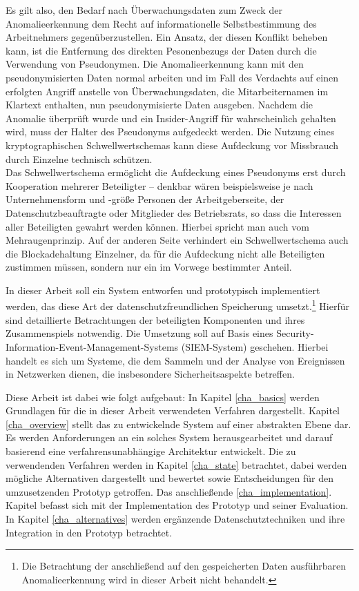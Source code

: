 Es gilt also, den Bedarf nach Überwachungsdaten zum Zweck der Anomalieerkennung dem Recht auf informationelle Selbstbestimmung des Arbeitnehmers gegenüberzustellen. 
Ein Ansatz, der diesen Konflikt beheben kann, ist die Entfernung des direkten Pesonenbezugs der Daten durch die Verwendung von Pseudonymen. Die Anomalieerkennung kann mit den pseudonymisierten Daten normal arbeiten und im Fall des Verdachts auf einen erfolgten Angriff anstelle von Überwachungsdaten, die Mitarbeiternamen im Klartext enthalten, nun pseudonymisierte Daten ausgeben. %
Nachdem die Anomalie überprüft wurde und ein Insider-Angriff für wahrscheinlich gehalten wird, muss der Halter des Pseudonyms aufgedeckt werden. Die Nutzung eines kryptographischen Schwellwertschemas kann diese Aufdeckung vor Missbrauch durch Einzelne technisch schützen.\\
Das Schwellwertschema ermöglicht die Aufdeckung eines Pseudonyms erst durch Kooperation mehrerer Beteiligter -- denkbar wären beispielsweise je nach Unternehmensform und -größe Personen der Arbeitgeberseite, der Datenschutzbeauftragte oder Mitglieder des Betriebsrats, so dass die Interessen aller Beteiligten gewahrt werden können. Hierbei spricht man auch vom Mehraugenprinzip. Auf der anderen Seite verhindert ein Schwellwertschema auch die Blockadehaltung Einzelner, da für die Aufdeckung nicht alle Beteiligten zustimmen müssen, sondern nur ein im Vorwege bestimmter Anteil.

In dieser Arbeit soll ein System entworfen und prototypisch implementiert werden, das diese Art der datenschutzfreundlichen Speicherung umsetzt.\footnote{
  Die Betrachtung der anschließend auf den gespeicherten Daten ausführbaren Anomalieerkennung wird in dieser Arbeit nicht behandelt. 
} Hierfür sind detaillierte Betrachtungen der beteiligten Komponenten und ihres Zusammenspiels notwendig. Die Umsetzung soll auf Basis eines Security-Information-Event-Management-Systems (SIEM-System) geschehen. Hierbei handelt es sich um Systeme, die dem Sammeln und der Analyse von Ereignissen in Netzwerken dienen, die insbesondere Sicherheitsaspekte betreffen.

Diese Arbeit ist dabei wie folgt aufgebaut:
In Kapitel \ref{cha_basics} werden Grundlagen für die in dieser Arbeit verwendeten Verfahren dargestellt.  
Kapitel \ref{cha_overview} stellt das zu entwickelnde System auf einer abstrakten Ebene dar. Es werden Anforderungen an ein solches System herausgearbeitet und darauf basierend eine verfahrensunabhängige Architektur entwickelt.
Die zu verwendenden Verfahren werden in Kapitel \ref{cha_state} betrachtet, dabei werden mögliche Alternativen dargestellt und bewertet sowie Entscheidungen für den umzusetzenden Prototyp getroffen.
Das anschließende \ref{cha_implementation}. Kapitel befasst sich mit der Implementation des Prototyp und seiner Evaluation. 
In Kapitel \ref{cha_alternatives} werden ergänzende Datenschutztechniken und ihre Integration in den Prototyp betrachtet.

